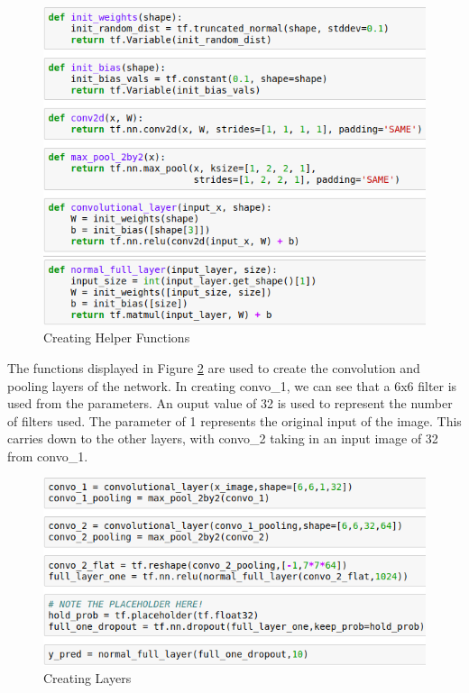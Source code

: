 \documentclass[12pt]{report}
\begin{document}
\vspace{0.5cm}
\begin{figure}[h]
	\centering
	\includegraphics[width=12cm]{helpers}
	\caption{Creating Helper Functions}
	\label{fig:helpers}
\end{figure}

\begin{flushleft}
The functions displayed in Figure \ref{fig:layers} are used to create the convolution and pooling layers of the network. In creating convo\_1, we can see that a 6x6 filter is used from the parameters. An ouput value of 32 is used to represent the number of filters used. The parameter of 1 represents the original input of the image. This carries down to the other layers, with convo\_2 taking in an input image of 32 from convo\_1.
\end{flushleft}

\vspace{0.5cm}
\begin{figure}[h]
	\centering
	\includegraphics[width=12cm]{layers}
	\caption{Creating Layers}
	\label{fig:layers}
\end{figure}
\end{document}
